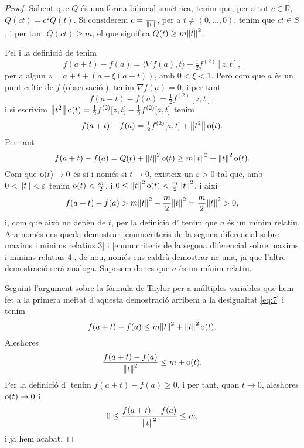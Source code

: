 \documentclass[../Apunts.tex]{subfiles}
\begin{document}
\begin{proposition}
\begin{proof}
			Sabent que \(Q\) és una forma bilineal simètrica, tenim que, per a tot \(c\in\mathbb{R}\), \(Q(ct)=c^{2}Q(t)\). Si considerem \(c=\frac{1}{\norm{t}}\), per a \(t\neq(0,\dots,0)\), tenim que \(ct\in S\), i per tant \(Q(ct)\geq m\), el que significa \(Q(t)\geq m\norm{t} ^{2}\).
			
			Pel  i la definició de  tenim
			\[f(a+t)-f(a)=\langle\nabla f(a),t\rangle+\tfrac{1}{2}f^{(2)}[z,t],\]
			per a algun \(z=a+t+(a-\xi(a+t))\), amb \(0<\xi<1\). Però com que \(a\) és un punt crític de \(f\) (observació ), tenim \(\nabla f(a)=0\), i per tant
			\[f(a+t)-f(a)=\tfrac{1}{2}f^{(2)}[z,t],\]
			i si escrivim \(\norm{t^{2}}\omicron(t)=\frac{1}{2}f^{(2)}[z,t]-\frac{1}{2}f^{(2)}[a,t]\) tenim
			\[f(a+t)-f(a)=\tfrac{1}{2}f^{(2)}[a,t]+\norm{t^{2}}\omicron(t).\]
			Per tant
			\begin{equation}\label{eq:7}
			f(a+t)-f(a)=Q(t)+\norm{t}^{2}\omicron(t)\geq m\norm{t}^{2}+\norm{t}^{2}\omicron(t).
			\end{equation}
			Com que \(\operatorname{o}(t)\to0\) és si i només si \(t\to0\), existeix un \(\varepsilon>0\) tal que, amb \(0<\norm{t}<\varepsilon\) tenim \(\operatorname{o}(t)<\frac{m}{2}\), i \(0\leq\norm{t}^{2}\omicron(t)<\frac{m}{2}\norm{t}^{2}\), i així
			\[f(a+t)-f(a)>m\norm{t}^{2}-\frac{m}{2}\norm{t}^{2}=\frac{m}{2}\norm{t}^{2}>0,\]
			i, com que això no depèn de \(t\), per la definició d' tenim que \(a\) és un mínim relatiu.
			Ara només ens queda demostrar \eqref{enum:criteris de la segona diferencial sobre maxims i minims relatius 3} i \eqref{enum:criteris de la segona diferencial sobre maxims i minims relatius 4}, de nou, només ens caldrà demostrar-ne una, ja que l'altre demostració serà anàloga. Suposem doncs que \(a\) és un mínim relatiu.
			
			Seguint l'argument sobre la fórmula de Taylor per a múltiples variables que hem fet a la primera meitat d'aquesta demostració arribem a la desigualtat \eqref{eq:7} i tenim
			\[f(a+t)-f(a)\leq m\norm{t}^{2}+\norm{t}^{2}\omicron(t).\]
			Aleshores
			\[\frac{f(a+t)-f(a)}{\norm{t}^{2}}\leq m+\omicron(t).\]
			Per la definició d' tenim \(f(a+t)-f(a)\geq0\), i per tant, quan \(t\to0\), aleshores \(\operatorname{o}(t)\to0\) i
			\[0\leq\frac{f(a+t)-f(a)}{\norm{t}^{2}}\leq m,\]
			i ja hem acabat.
		\end{proof}
	\end{proposition}
\end{document}
